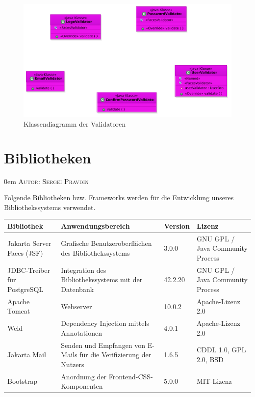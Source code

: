 \documentclass{article}
\makeatletter
\newcommand{\sectionauthor}[1]{
	{\parindent 0em \large \scshape Autor: #1 \par \nobreak \vspace*{1em}}
	\@afterheading
}
\makeatother
\begin{document}
\begin{center}
    \begin{figure}[H]
	\hypertarget{Validator}{}
        \includegraphics[scale=0.6]{KlassendiagrammValidators.pdf}
        \caption{Klassendiagramm der Validatoren }
        \label{fig:Util-data Klassendiagramm}
    \end{figure}
\end{center}
\restoregeometry
\newpage
\section{Bibliotheken}
\sectionauthor{Sergei Pravdin}

\newenvironment{controls}
{
    \begin{table}[H]
        \centering
        \begin{tabular}{ p{7em} p{19em} p{4em} p{12em} }
            \toprule
            \textbf{Bibliothek} & \textbf{Anwendungsbereich} & \textbf{Version} & \textbf{Lizenz}\\
            \midrule
        }
        {
            \bottomrule
        \end{tabular}
    \end{table}
}

Folgende Bibliotheken bzw. Frameworks werden für die Entwicklung unseres Bibliothekssystems verwendet.

\begin{controls}
    Jakarta Server Faces (JSF) & Grafische Benutzeroberflächen des Bibliothekssystems & 3.0.0 & GNU GPL / Java Community Process\\
    JDBC-Treiber für PostgreSQL & Integration des Bibliothekssystems mit der Datenbank & 42.2.20 & GNU GPL / Java Community Process\\
    Apache Tomcat & Webserver & 10.0.2 & Apache-Lizenz 2.0\\
    Weld & Dependency Injection mittels Annotationen & 4.0.1 & Apache-Lizenz 2.0\\
    Jakarta Mail & Senden und Empfangen von E-Mails für die Verifizierung der Nutzers & 1.6.5 & CDDL 1.0, GPL 2.0, BSD\\
    Bootstrap & Anordnung der Frontend-CSS-Komponenten & 5.0.0 & MIT-Lizenz\\
\end{controls}
\end{document}
